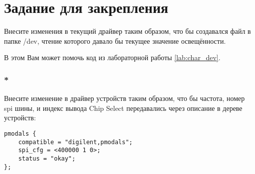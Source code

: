 \section{Задание для закрепления}
Внесите изменения в текущий драйвер таким образом, что бы создавался файл в папке /dev, чтение которого давало бы текущее значение освещённости.

В этом Вам может помочь код из лабораторной работы \ref{lab:char_dev}.

\subsubsection{*}
Внесите изменение в драйвер устройств таким образом, что бы частота, номер spi шины, и индекс вывода Chip Select передавались через описание в дереве устройств:
\begin{lstlisting}[style=stdout]
pmodals {
	compatible = "digilent,pmodals";
	spi_cfg = <400000 1 0>;	  
	status = "okay";
};
\end{lstlisting}